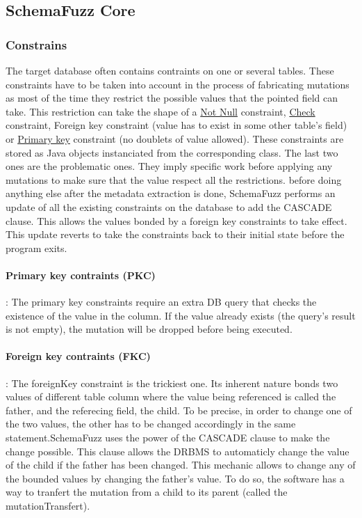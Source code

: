 \documentclass{article}
\begin{document}
		\subsection{SchemaFuzz Core}		
			\subsubsection{Constrains}
The target database often contains contraints on one or several tables. These constraints have to be taken into account in the process of fabricating mutations as most of the time they restrict the possible values that the pointed field can take. This restriction can take the shape of a \underline {Not Null} constraint, \underline{Check} constraint, {Foreign key} constraint (value has to exist in some other table's field) or \underline{Primary key} constraint (no doublets of value allowed). These constraints are stored as Java objects instanciated from the corresponding class.
The last two ones are the problematic ones. They imply specific work before applying any mutations to make sure that the value respect all the restrictions. before doing anything else after the metadata extraction is done, SchemaFuzz performs an update of all the existing constraints on the database to add the CASCADE clause. This allows the values bonded by a foreign key constraints to take effect. This update reverts to take the constraints back to their initial state before the program exits.
				\paragraph{Primary key contraints (PKC)} :
The primary key constraints require an extra DB query that checks the existence of the value in the column. If the value already exists (the query's result is not empty), the mutation will be dropped before being executed.
				\paragraph{Foreign key contraints (FKC)} :
The foreignKey constraint is the trickiest one. Its inherent nature bonds two values of different table column where the value being referenced is called the father, and the referecing field, the child. To be precise, in order to change one of the two values, the other has to be changed accordingly in the same statement.SchemaFuzz uses the power of the CASCADE clause to make the change possible. This clause allows the DRBMS to automaticly change the value of the child if the father has been changed.
This mechanic allows to change any of the bounded values by changing the father's value.
To do so, the software has a way to tranfert the mutation from a child to its parent (called the mutationTransfert).
\end{document}
